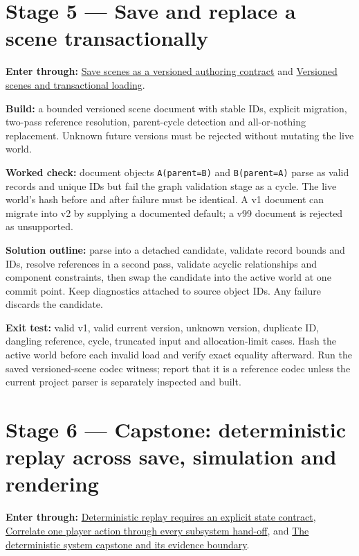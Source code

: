\section{Stage 5 --- Save and replace a scene transactionally}\label{06-engine-ii-ch042-stage-5-save-and-replace-a-scene-transactionally}

\textbf{Enter through:} \hyperref[06-engine-ii-ch033-save-scenes-as-a-versioned-authoring-contract]{Save scenes as a versioned authoring contract} and \hyperref[06-engine-ii-ch033-save-scenes-as-a-versioned-authoring-contract]{Versioned scenes and transactional loading}.

\textbf{Build:} a bounded versioned scene document with stable IDs, explicit migration, two-pass reference resolution, parent-cycle detection and all-or-nothing replacement. Unknown future versions must be rejected without mutating the live world.

\textbf{Worked check:} document objects \texttt{A(parent=B)} and \texttt{B(parent=A)} parse as valid records and unique IDs but fail the graph validation stage as a cycle. The live world's hash before and after failure must be identical. A v1 document can migrate into v2 by supplying a documented default; a v99 document is rejected as unsupported.

\textbf{Solution outline:} parse into a detached candidate, validate record bounds and IDs, resolve references in a second pass, validate acyclic relationships and component constraints, then swap the candidate into the active world at one commit point. Keep diagnostics attached to source object IDs. Any failure discards the candidate.

\textbf{Exit test:} valid v1, valid current version, unknown version, duplicate ID, dangling reference, cycle, truncated input and allocation-limit cases. Hash the active world before each invalid load and verify exact equality afterward. Run the saved versioned-scene codec witness; report that it is a reference codec unless the current project parser is separately inspected and built.

\section{Stage 6 --- Capstone: deterministic replay across save, simulation and rendering}\label{06-engine-ii-ch042-stage-6-capstone-deterministic-replay-across-save-simulation-and-rendering}

\textbf{Enter through:} \hyperref[06-engine-ii-ch042-deterministic-replay-requires-an-explicit-state-contract]{Deterministic replay requires an explicit state contract}, \hyperref[06-engine-ii-ch041-correlate-one-player-action-through-every-subsystem-hand-off]{Correlate one player action through every subsystem hand-off}, and \hyperref[06-engine-ii-ch042-the-deterministic-system-capstone-and-its-evidence-boundary]{The deterministic system capstone and its evidence boundary}.

